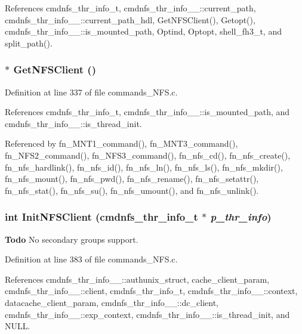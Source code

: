References cmdnfs\_\-thr\_\-info\_\-t, cmdnfs\_\-thr\_\-info\_\-\_\-::current\_\-path, cmdnfs\_\-thr\_\-info\_\-\_\-::current\_\-path\_\-hdl, Get\-NFSClient(), Getopt(), cmdnfs\_\-thr\_\-info\_\-\_\-::is\_\-mounted\_\-path, Optind, Optopt, shell\_\-fh3\_\-t, and split\_\-path().
\subsubsection{$\ast$ Get\-NFSClient ()}\label{commands__NFS_8c_a17}




Definition at line 337 of file commands\_\-NFS.c.

References cmdnfs\_\-thr\_\-info\_\-t, cmdnfs\_\-thr\_\-info\_\-\_\-::is\_\-mounted\_\-path, and cmdnfs\_\-thr\_\-info\_\-\_\-::is\_\-thread\_\-init.

Referenced by fn\_\-MNT1\_\-command(), fn\_\-MNT3\_\-command(), fn\_\-NFS2\_\-command(), fn\_\-NFS3\_\-command(), fn\_\-nfs\_\-cd(), fn\_\-nfs\_\-create(), fn\_\-nfs\_\-hardlink(), fn\_\-nfs\_\-id(), fn\_\-nfs\_\-ln(), fn\_\-nfs\_\-ls(), fn\_\-nfs\_\-mkdir(), fn\_\-nfs\_\-mount(), fn\_\-nfs\_\-pwd(), fn\_\-nfs\_\-rename(), fn\_\-nfs\_\-setattr(), fn\_\-nfs\_\-stat(), fn\_\-nfs\_\-su(), fn\_\-nfs\_\-umount(), and fn\_\-nfs\_\-unlink().
\subsubsection{\setlength{\rightskip}{0pt plus 5cm}int Init\-NFSClient ({\bf cmdnfs\_\-thr\_\-info\_\-t} $\ast$ {\em p\_\-thr\_\-info})}\label{commands__NFS_8c_a18}


\begin{Desc}
\item[{\bf Todo}]No secondary groups support.\end{Desc}


Definition at line 383 of file commands\_\-NFS.c.

References cmdnfs\_\-thr\_\-info\_\-\_\-::authunix\_\-struct, cache\_\-client\_\-param, cmdnfs\_\-thr\_\-info\_\-\_\-::client, cmdnfs\_\-thr\_\-info\_\-t, cmdnfs\_\-thr\_\-info\_\-\_\-::context, datacache\_\-client\_\-param, cmdnfs\_\-thr\_\-info\_\-\_\-::dc\_\-client, cmdnfs\_\-thr\_\-info\_\-\_\-::exp\_\-context, cmdnfs\_\-thr\_\-info\_\-\_\-::is\_\-thread\_\-init, and NULL.

